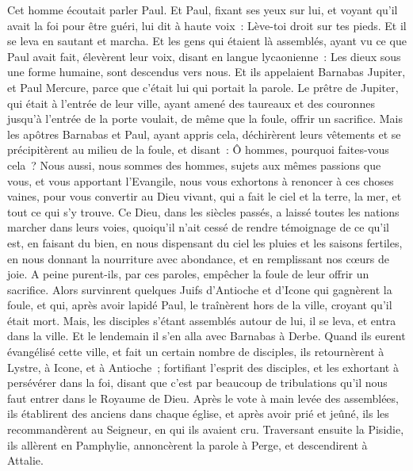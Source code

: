 \begin{multicols}{2}
Cet homme écoutait parler Paul. Et Paul, fixant ses yeux sur lui, et voyant qu'il avait la foi pour être guéri,
lui dit à haute voix~: Lève-toi droit sur tes pieds. Et il se leva en sautant et marcha.
Et les gens qui étaient là assemblés, ayant vu ce que Paul avait fait, élevèrent leur voix, disant en langue lycaonienne~: Les dieux sous une forme humaine, sont descendus vers nous.
Et ils appelaient Barnabas Jupiter, et Paul Mercure, parce que c'était lui qui portait la parole.
Le prêtre de Jupiter, qui était à l'entrée de leur ville, ayant amené des taureaux et des couronnes jusqu'à l'entrée de la porte voulait, de même que la foule, offrir un sacrifice.
Mais les apôtres Barnabas et Paul, ayant appris cela, déchirèrent leurs vêtements et se précipitèrent au milieu de la foule,
et disant~: Ô hommes, pourquoi faites-vous cela~? Nous aussi, nous sommes des hommes, sujets aux mêmes passions que vous, et vous apportant l'Evangile, nous vous exhortons à renoncer à ces choses vaines, pour vous convertir au Dieu vivant, qui a fait le ciel et la terre, la mer, et tout ce qui s'y trouve.
Ce Dieu, dans les siècles passés, a laissé toutes les nations marcher dans leurs voies,
quoiqu'il n'ait cessé de rendre témoignage de ce qu'il est, en faisant du bien, en nous dispensant du ciel les pluies et les saisons fertiles, en nous donnant la nourriture avec abondance, et en remplissant nos cœurs de joie.
A peine purent-ils, par ces paroles, empêcher la foule de leur offrir un sacrifice.
Alors survinrent quelques Juifs d'Antioche et d'Icone qui gagnèrent la foule, et qui, après avoir lapidé Paul, le traînèrent hors de la ville, croyant qu'il était mort.
Mais, les disciples s'étant assemblés autour de lui, il se leva, et entra dans la ville. Et le lendemain il s'en alla avec Barnabas à Derbe.
Quand ils eurent évangélisé cette ville, et fait un certain nombre de disciples, ils retournèrent à Lystre, à Icone, et à Antioche~;
fortifiant l'esprit des disciples, et les exhortant à persévérer dans la foi, disant que c'est par beaucoup de tribulations qu'il nous faut entrer dans le Royaume de Dieu.
Après le vote à main levée des assemblées, ils établirent des anciens dans chaque église, et après avoir prié et jeûné, ils les recommandèrent au Seigneur, en qui ils avaient cru.
Traversant ensuite la Pisidie, ils allèrent en Pamphylie,
annoncèrent la parole à Perge, et descendirent à Attalie.

\end{multicols}
